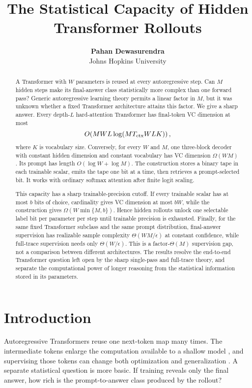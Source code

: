 \documentclass{article}
\title{The Statistical Capacity of Hidden Transformer Rollouts}
\author{\textbf{Pahan Dewasurendra} \\ Johns Hopkins University}
\newcommand{\1}{\mathbf 1}
\begin{document}
\maketitle

\begin{abstract}
A Transformer with $W$ parameters is reused at every autoregressive step. Can $M$ hidden
steps make its final-answer class statistically more complex than one forward pass? Generic
autoregressive learning theory permits a linear factor in $M$, but it was unknown whether a fixed
Transformer architecture attains this factor. We give a sharp answer. Every depth-$L$
hard-attention Transformer has final-token VC dimension at most
\[
 O\!\left(MWL\log(MT_{\rm ctx}WLK)\right),
\]
where $K$ is vocabulary size. Conversely, for every $W$ and $M$, one three-block decoder with
constant hidden dimension and constant vocabulary has VC dimension $\Omega(WM)$. Its prompt
has length $O(\log W+\log M)$. The construction stores a binary tape in each trainable scalar,
emits the tape one bit at a time, then retrieves a prompt-selected bit. It works with ordinary
softmax attention after finite logit scaling.

This capacity has a sharp trainable-precision cutoff. If every trainable scalar has at most $b$ bits of
choice, cardinality gives VC dimension at most $bW$, while the construction gives
$\Omega(W\min\{M,b\})$. Hence hidden rollouts unlock one selectable label bit per parameter per
step until trainable precision is exhausted. Finally, for the same fixed Transformer subclass and
the same prompt distribution, final-answer supervision has realizable sample complexity
$\Theta(WM/\epsilon)$ at constant confidence, while full-trace supervision needs only
$\Theta(W/\epsilon)$. This is a factor-$\Theta(M)$ supervision gap, not a comparison between
different architectures. The results resolve the end-to-end Transformer question left open by the
sharp single-pass and full-trace theory, and separate the computational power of longer reasoning
from the statistical information stored in its parameters.
\end{abstract}

\section{Introduction}

Autoregressive Transformers reuse one next-token map many times. The intermediate tokens enlarge
the computation available to a shallow model \citep{merrill2023expressive,li2024serial}, and
supervising those tokens can change both optimization and generalization
\citep{kim2025parity,altabaa2025cot}. A separate statistical question is more basic. If training
reveals only the final answer, how rich is the prompt-to-answer class produced by the rollout?
\end{document}
